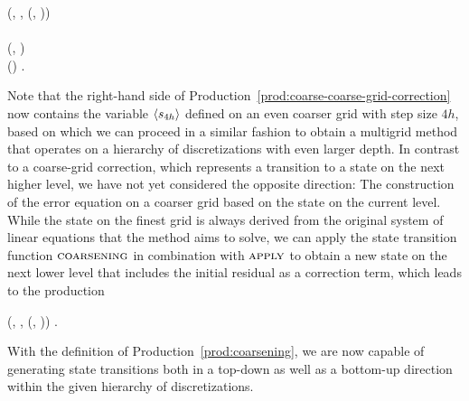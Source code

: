 \begin{production}
	 {
		(\bnfts{$\omega$}, \bnfsp {}, \bnfsp {}(, \bnfsp {})) \bnfor
	} \\
	\label{prod:coarse-coarse-grid-correction} \\
	 {
		(, \bnfsp {})
	} \\
	 {
		() \bnfsp {} \bnfsp {}.
	}
\end{production}Note that the right-hand side of Production~\eqref{prod:coarse-coarse-grid-correction} now contains the variable $\langle s_{4h} \rangle$ defined on an even coarser grid with step size $4h$, based on which we can proceed in a similar fashion to obtain a multigrid method that operates on a hierarchy of discretizations with even larger depth.
In contrast to a coarse-grid correction, which represents a transition to a state on the next higher level, we have not yet considered the opposite direction: The construction of the error equation on a coarser grid based on the state on the current level.
While the state on the finest grid is always derived from the original system of linear equations that the method aims to solve, we can apply the state transition function $\textsc{coarsening}$ in combination with $\textsc{apply}$ to obtain a new state on the next lower level that includes the initial residual as a correction term, which leads to the production
\begin{production}
 {
	(, \bnfsp {}, \bnfsp {}(, \bnfsp {}))
}.
\label{prod:coarsening}
\end{production}With the definition of Production~\eqref{prod:coarsening}, we are now capable of generating state transitions both in a top-down as well as a bottom-up direction within the given hierarchy of discretizations.

